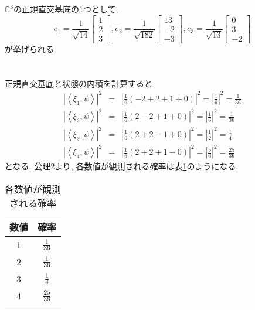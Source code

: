 \documentclass[a4paper,11pt]{jsarticle}
\begin{document}
\section{}
$\mathbb{C}^3$の正規直交基底の1つとして, 
\[
  e_1 = \frac{1}{\sqrt{14}}\begin{bmatrix}
    1 \\ 2 \\ 3
  \end{bmatrix}, 
  e_2 = \frac{1}{\sqrt{182}}\begin{bmatrix}
    13 \\ -2 \\ -3
  \end{bmatrix},
  e_3 = \frac{1}{\sqrt{13}}\begin{bmatrix}
    0 \\ 3 \\ -2
  \end{bmatrix}
\]
が挙げられる.

\section{}
正規直交基底と状態の内積を計算すると
\begin{eqnarray*}
  |\left<\xi_1, \psi\right>|^2
  &=& \left|\frac{1}{6}(-2 + 2 + 1 + 0)\right|^2
  = \left|\frac{1}{6}\right|^2 = \frac{1}{36} \\
  |\left<\xi_2, \psi\right>|^2
  &=& \left|\frac{1}{6}(2 - 2 + 1 + 0)\right|^2
  = \left|\frac{1}{6}\right|^2 = \frac{1}{36} \\
  |\left<\xi_3, \psi\right>|^2
  &=& \left|\frac{1}{6}(2 + 2 - 1 + 0)\right|^2
  = \left|\frac{1}{2}\right|^2 = \frac{1}{4} \\
  |\left<\xi_4, \psi\right>|^2
  &=& \left|\frac{1}{6}(2 + 2 + 1 - 0)\right|^2
  = \left|\frac{5}{6}\right|^2 = \frac{25}{36}
\end{eqnarray*}
となる. 公理2より, 各数値が観測される確率は表\ref{prob}のようになる.
\begin{table}[hbtp]
  \caption{各数値が観測される確率}
  \label{prob}
  \centering
  \begin{tabular}{|c|c|}
    \hline
    数値 & 確率 \\
    \hline
    1 & $\frac{1}{36}$ \\
    \hline
    2 & $\frac{1}{36}$ \\
    \hline
    3 & $\frac{1}{4}$ \\
    \hline
    4 & $\frac{25}{36}$ \\
    \hline
  \end{tabular}
\end{table}
\end{document}
